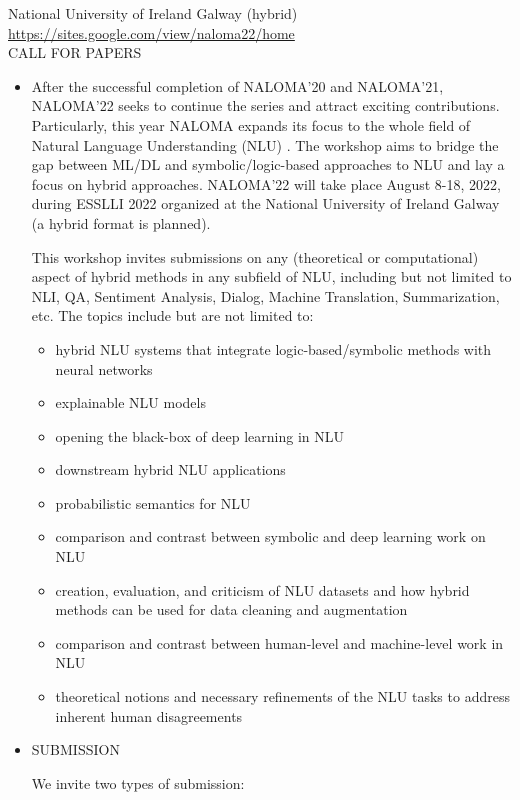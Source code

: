 \documentclass[prodmode,acmtecs]{acmsmall} %
\begin{document}
  National University of Ireland Galway (hybrid)\\ 
  \href{https://sites.google.com/view/naloma22/home}{https://sites.google.com/view/naloma22/home}\\ 
CALL FOR PAPERS 

\begin{itemize}\item  After the successful completion of NALOMA’20 and NALOMA’21, NALOMA'22 seeks to continue the series and attract exciting contributions. Particularly, this year NALOMA expands its focus to the whole field of Natural Language Understanding (NLU) . The workshop aims to bridge the gap between ML/DL and symbolic/logic-based approaches to NLU and lay a focus on hybrid approaches. NALOMA'22 will take place August 8-18, 2022, during ESSLLI 2022 organized at the National University of Ireland Galway (a hybrid format is planned). 
 
  This workshop invites submissions on any (theoretical or computational) aspect of hybrid methods in any subfield of NLU, including but not limited to NLI, QA, Sentiment Analysis, Dialog, Machine Translation, Summarization, etc. The topics include but are not limited to: 
 
\begin{itemize}\item  hybrid NLU systems that integrate logic-based/symbolic methods with neural networks
\item  explainable NLU models
\item  opening the black-box of deep learning in NLU
\item  downstream hybrid NLU applications
\item  probabilistic semantics for NLU
\item  comparison and contrast between symbolic and deep learning work on NLU
\item  creation, evaluation, and criticism of NLU datasets and how hybrid methods can be used for data cleaning and augmentation
\item  comparison and contrast between human-level and machine-level work in NLU
\item  theoretical notions and necessary refinements of the NLU tasks to address inherent human disagreements
\end{itemize} 
\item  SUBMISSION 
 
  We invite two types of submission: 
 

\end{itemize}
\end{document}
